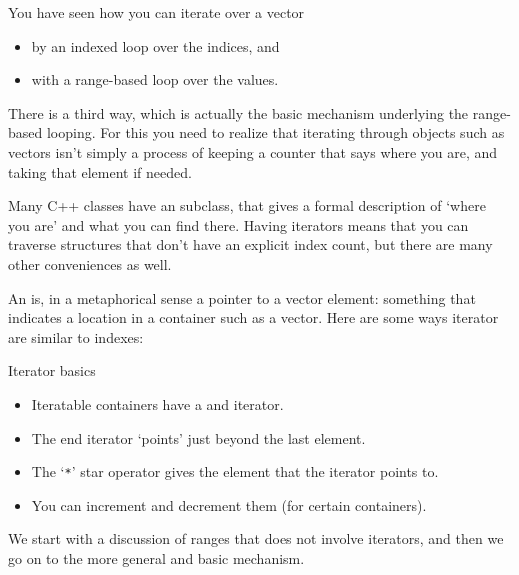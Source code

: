 
You have seen how you can iterate over a vector
\begin{itemize}
\item by an indexed loop over the indices, and
\item with a range-based loop over the values.
\end{itemize}
There is a third way, which is actually the basic mechanism underlying
the range-based looping.
For this you need to realize that
iterating through objects such as vectors isn't simply a process
of keeping a counter that says where you are, and taking that element if needed.

Many C++ classes have an  subclass,
that gives a formal description of `where you are' and what you can find there.
Having iterators means that you can traverse structures that don't have
an explicit index count, but there are many other conveniences as well.

An  is, in a metaphorical sense
a pointer to a vector element:
something that indicates a location in a container
such as a vector.
Here are some ways iterator are similar to indexes:

\begin{block}{Iterator basics}
  \begin{itemize}
  \item
    Iteratable containers have a  and  iterator.
  \item
    The end iterator `points' just beyond the last element.
  \item The `\lstinline+*+' star operator gives the element that the iterator points to.
  \item You can increment and decrement them (for certain containers).
  \end{itemize}
\end{block}

We start with a discussion of ranges that does not involve iterators,
and then we go on to the more general and basic mechanism.

